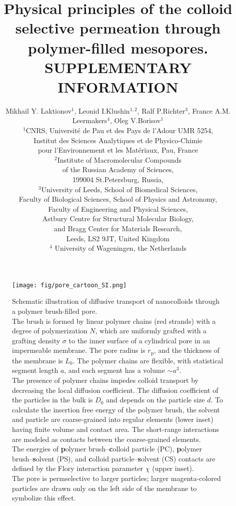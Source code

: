 \documentclass[10pt, a4paper]{article}
\title{Physical principles of the colloid selective permeation through polymer-filled mesopores.\\
        SUPPLEMENTARY INFORMATION}
\author{Mikhail Y. Laktionov$^1$, Leonid I.Klushin$^{1,2}$, Ralf P.Richter$^3$, France A.M. Leermakers$^4$, Oleg V.Borisov$^1$\\
$^{1}$CNRS, Universit\'e de Pau et des Pays de l'Adour UMR 5254,\\
Institut des Sciences Analytiques et de Physico-Chimie\\
pour l'Environnement et les Mat\'eriaux, Pau, France \\
$^{2}$Institute of Macromolecular Compounds \\
of the Russian Academy of Sciences, \\
199004 St.Petersburg, Russia,\\
$^{3}$University of Leeds, School of Biomedical Sciences, \\
Faculty of Biological Sciences, 
School of Physics and Astronomy, \\
Faculty of Engineering and Physical Sciences,\\  
Astbury Centre for Structural Molecular Biology,\\ 
and Bragg Center for Materials Research,\\ 
Leeds, LS2 9JT, United Kingdom\\
$^{4}$ University of Wageningen, the Netherlands}
\date{}
\begin{document}
\maketitle

\pagebreak

\begin{figure*}[htp!]
    \centering
    \texttt{[image: fig/pore\_cartoon\_SI.png]}
    \caption{
        Schematic illustration of diffusive transport of nanocolloids through a polymer brush-filled pore.
        \\
        The brush is formed by linear polymer chains (red strands) with a degree of polymerization $N$, which are uniformly grafted with a grafting density $\sigma$ to the inner surface of a cylindrical pore in an impermeable membrane.
        The pore radius is $r_{\text{p}}$, and the thickness of the membrane is $L_{0}$.
        The polymer chains are flexible, with statistical segment length $a$, and each segment has a volume $\sim a^3$.
        \\
        The presence of polymer chains impedes colloid transport by decreasing the local diffusion coefficient.
        The diffusion coefficient of the particles in the bulk is $D_0$ and depends on the particle size $d$.
        To calculate the insertion free energy of the polymer brush, the solvent and particle are coarse-grained into regular elements (lower inset) having finite volume and contact area.
        The short-range interactions are modeled as contacts between the coarse-grained elements.
        \\
        The energies of 
        \textbf{p}olymer brush–\textbf{c}olloid particle (PC), 
        \textbf{p}olymer brush–\textbf{s}olvent (PS),  
        and \textbf{c}olloid particle–\textbf{s}olvent (CS) contacts are defined by the Flory interaction parameter $\chi$ (upper inset).
        \\
        The pore is permselective to larger particles; larger magenta-colored particles are drawn only on the left side of the membrane to symbolize this effect.
    }
        \label{fig:colloid_transport_SI}
\end{figure*}

\end{document}
